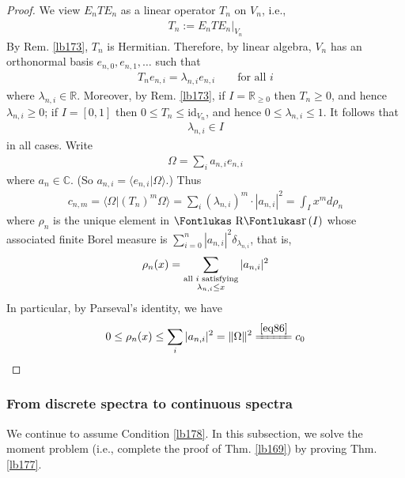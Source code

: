 \documentclass[12pt,b5paper,notitlepage]{article}
\theoremstyle{definition}
\theoremstyle{plain}
\DeclareMathOperator{\Rr}{\text{\Fontlukas R}\text{\kern -0pt {\Fontlukas\large r}}\,}
\newcommand{\id}{\mathrm{id}}
\newcommand{\bk}[1]{\langle {#1}\rangle}
\newcommand{\Cbb}{\mathbb C}
\newcommand{\Rbb}{\mathbb R}
\numberwithin{equation}{section}
\begin{document}
\begin{proof}
We view $E_nTE_n$ as a linear operator $T_n$ on $V_n$, i.e.,
\begin{align}\label{eq120}
T_n:=E_nTE_n\big|_{V_n}
\end{align}
By Rem. \ref{lb173}, $T_n$ is Hermitian. Therefore, by linear algebra, $V_n$ has an orthonormal basis $e_{n,0},e_{n,1},\dots$ such that
\begin{align}
T_ne_{n,i}=\lambda_{n,i}e_{n,i}\qquad\text{for all }i
\end{align}
where $\lambda_{n,i}\in\Rbb$. Moreover, by Rem. \ref{lb173}, if $I=\Rbb_{\geq0}$ then $T_n\geq0$, and hence $\lambda_{n,i}\geq0$; if $I=[0,1]$ then $0\leq T_n\leq\id_{V_n}$, and hence $0\leq\lambda_{n,i}\leq 1$. It follows that
\begin{align*}
\lambda_{n,i}\in I
\end{align*}
in all cases. Write
\begin{align}
\Omega=\sum_i a_{n,i}e_{n,i}
\end{align}
where $a_n\in\Cbb$. (So $a_{n,i}=\bk{e_{n,i}|\Omega}$.) Thus
\begin{align*}
c_{n,m}=\bk{\Omega|(T_n)^m\Omega}=\sum_i (\lambda_{n,i})^m\cdot |a_{n,i}|^2=\int_I x^md\rho_n
\end{align*}
where $\rho_n$ is the unique element in $\Rr(I)$ whose associated finite Borel measure is $\sum_{i=0}^n|a_{n,i}|^2\delta_{\lambda_{n,i}}$, that is,
\begin{align}\label{eq119}
\rho_n(x)=\sum_{
\begin{subarray}{c}
\text{all $i$ satisfying}\\
\lambda_{n,i}\leq x
\end{subarray}
}|a_{n,i}|^2
\end{align}
In particular, by Parseval's identity, we have
\begin{align*}
0\leq \rho_n(x)\leq\sum_i |a_{n,i}|^2=\Vert\Omega\Vert^2\xlongequal{\eqref{eq86}}c_0
\end{align*}
\end{proof}




\subsubsection{From discrete spectra to continuous spectra}\label{lb205}


We continue to assume Condition \ref{lb178}. In this subsection, we solve the moment problem (i.e., complete the proof of Thm. \ref{lb169}) by proving Thm. \ref{lb177}.
\end{document}
